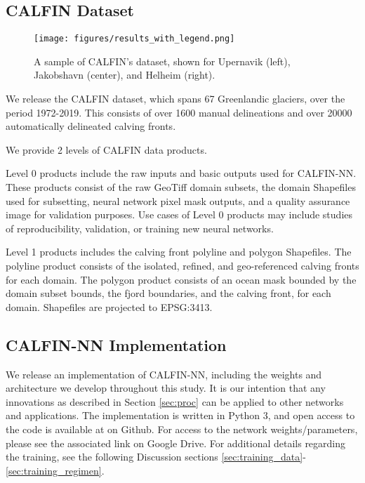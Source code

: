 \documentclass[tc, manuscript]{copernicus}
\begin{document}
\subsection{CALFIN Dataset}
\label{sec:results_dataset}

\begin{figure}[h]
    \texttt{[image: figures/results\_with\_legend.png]}
    \centering
    \caption{A sample of CALFIN's dataset, shown for Upernavik (left), Jakobshavn (center), and Helheim (right).}
    \label{sec:timeseries}
\end{figure}

We release the CALFIN dataset, which spans 67 Greenlandic glaciers, over the period 1972-2019. This consists of over 1600 manual delineations and over 20000 automatically delineated calving fronts.

We provide 2 levels of CALFIN data products.

Level 0 products include the raw inputs and basic outputs used for CALFIN-NN. These products consist of the raw GeoTiff domain subsets, the domain Shapefiles used for subsetting, neural network pixel mask outputs, and a quality assurance image for validation purposes. Use cases of Level 0 products may include studies of reproducibility, validation, or training new neural networks.

Level 1 products includes the calving front polyline and polygon Shapefiles. The polyline product consists of the isolated, refined, and geo-referenced calving fronts for each domain. The polygon product consists of an ocean mask bounded by the domain subset bounds, the fjord boundaries, and the calving front, for each domain. Shapefiles are projected to EPSG:3413.

\subsection{CALFIN-NN Implementation}
\label{sec:results_implementation}
We release an implementation of CALFIN-NN, including the weights and architecture we develop throughout this study. It is our intention that any innovations as described in Section \ref{sec:proc} can be applied to other networks and applications. The implementation is written in Python 3, and open access to the code is available at on Github. For access to the network weights/parameters, please see the associated link on Google Drive. For additional details regarding the training, see the following Discussion sections \ref{sec:training_data}-\ref{sec:training_regimen}.
\end{document}
